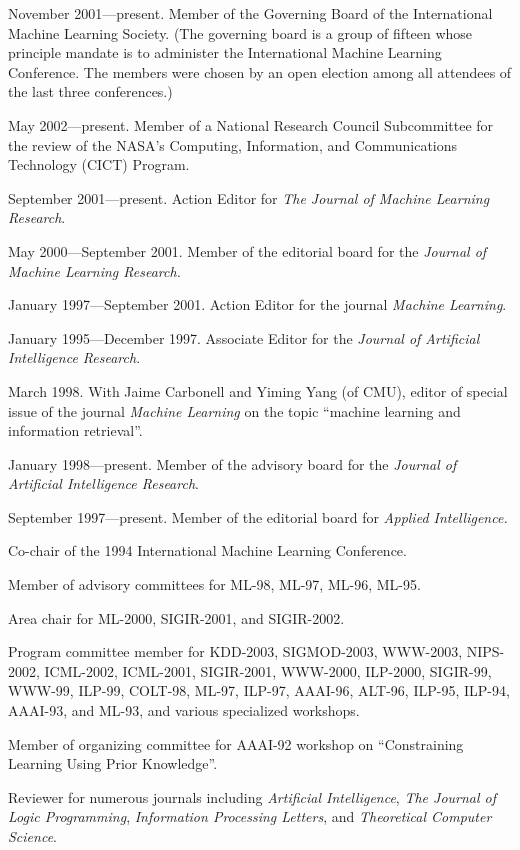 \bi
\item November 2001---present.  Member of the Governing Board of the
International Machine Learning Society.  (The governing board is a
group of fifteen whose principle mandate is to administer the
International Machine Learning Conference.  The members were chosen by
an open election among all attendees of the last three conferences.)
\item May 2002---present. Member of a National Research Council
Subcommittee for the review of the NASA's Computing, Information, and
Communications Technology (CICT) Program.
\item September 2001---present.  
Action Editor for {\it The Journal of Machine Learning Research\/}.
\item May 2000---September 2001. Member of the editorial 
board for the {\it Journal of Machine Learning Research.}
\item January 1997---September 2001. 
Action Editor for the journal {\it Machine Learning\/}.
\item January 1995---December 1997. Associate Editor for the 
{\it Journal of Artificial Intelligence Research}.
\item March 1998.  With Jaime Carbonell and Yiming Yang (of CMU),
editor of special issue of the journal {\it Machine Learning\/} on the
topic ``{machine learning and information retrieval\/}''.
\item January 1998---present. Member of the advisory board for
the {\it Journal of Artificial Intelligence Research}.
\item September 1997---present.  Member of the editorial 
board for {\it Applied Intelligence.}
\item Co-chair of the 1994 International Machine Learning Conference.
\item Member of advisory committees for ML-98, ML-97, ML-96, ML-95.
\item Area chair for ML-2000, SIGIR-2001, and SIGIR-2002.
\item Program committee member for KDD-2003, SIGMOD-2003, WWW-2003, 
NIPS-2002, ICML-2002, ICML-2001, SIGIR-2001, WWW-2000, 
ILP-2000, SIGIR-99, WWW-99, ILP-99,
COLT-98, ML-97, ILP-97, AAAI-96, ALT-96, ILP-95, ILP-94, AAAI-93, and
ML-93, and various specialized workshops.
\item Member of organizing committee for AAAI-92 workshop on
``Constraining Learning Using Prior Knowledge''.
\item Reviewer for numerous journals including {\it Artificial 
Intelligence}, {\it The Journal of Logic Programming}, 
{\it Information Processing Letters},
and {\it Theoretical Computer Science}.
\ei


